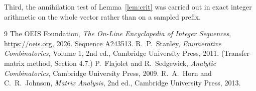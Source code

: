\documentclass[11pt,a4paper]{article}
\theoremstyle{plain}
\theoremstyle{definition}
\begin{document}
Third, the annihilation test of Lemma~\ref{lem:crit} was carried out in exact integer
arithmetic on the whole vector rather than on a sampled prefix.

\begin{thebibliography}{9}
 The OEIS Foundation, \emph{The On-Line Encyclopedia of Integer
Sequences}, \url{https://oeis.org}, 2026. Sequence A243513.
 R.~P.~Stanley, \emph{Enumerative Combinatorics}, Volume 1, 2nd ed.,
Cambridge University Press, 2011. (Transfer-matrix method, Section 4.7.)
 P.~Flajolet and R.~Sedgewick, \emph{Analytic Combinatorics}, Cambridge
University Press, 2009.
 R.~A.~Horn and C.~R.~Johnson, \emph{Matrix Analysis}, 2nd ed., Cambridge
University Press, 2013.
\end{thebibliography}
\end{document}
